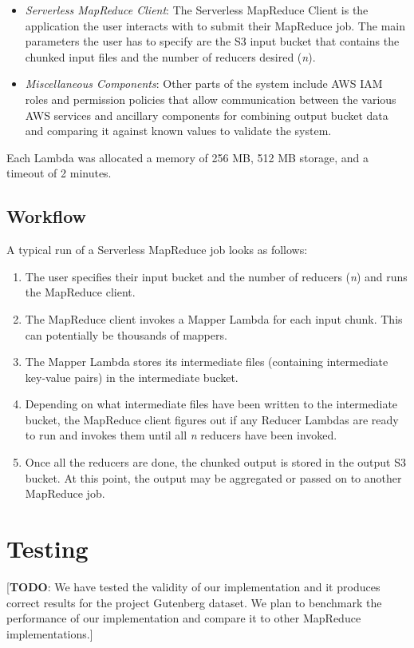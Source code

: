 \begin{itemize}
    \item \emph{Serverless MapReduce Client}: The Serverless MapReduce Client is the application the user interacts with to submit their MapReduce job. The main parameters the user has to specify are the S3 input bucket that contains the chunked input files and the number of reducers desired (\emph{n}).

    \item \emph{Miscellaneous Components}: Other parts of the system include AWS IAM roles and permission policies that allow communication between the various AWS services and ancillary components for combining output bucket data and comparing it against known values to validate the system.
\end{itemize}

Each Lambda was allocated a memory of 256 MB, 512 MB storage, and a timeout of 2 minutes.

\subsection{Workflow}

A typical run of a Serverless MapReduce job looks as follows:

\begin{enumerate}
    \item The user specifies their input bucket and the number of reducers (\emph{n}) and runs the MapReduce client.
    \item The MapReduce client invokes a Mapper Lambda for each input chunk. This can potentially be thousands of mappers.
    \item The Mapper Lambda stores its intermediate files (containing intermediate key-value pairs) in the intermediate bucket.
    \item Depending on what intermediate files have been written to the intermediate bucket, the MapReduce client figures out if any Reducer Lambdas are ready to run and invokes them until all \emph{n} reducers have been invoked.
    \item Once all the reducers are done, the chunked output is stored in the output S3 bucket. At this point, the output may be aggregated or passed on to another MapReduce job.
\end{enumerate}

\section{Testing}

[\textbf{TODO}: We have tested the validity of our implementation and it produces correct results for the project Gutenberg dataset. We plan to benchmark the performance of our implementation and compare it to other MapReduce implementations.]